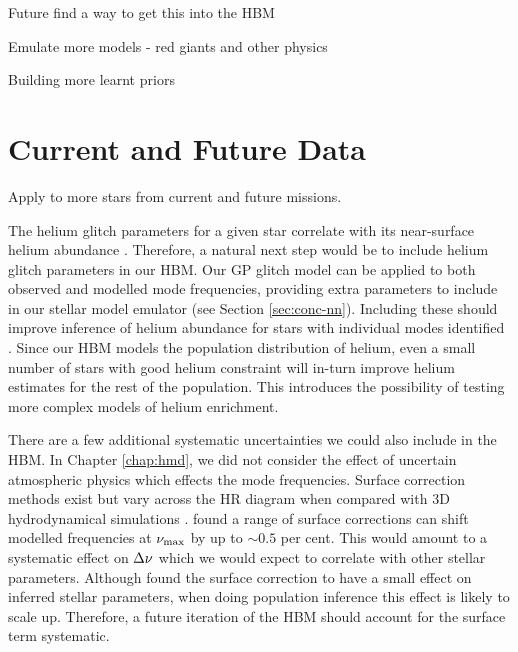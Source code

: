 Future find a way to get this into the HBM

Emulate more models - red giants and other physics

Building more learnt priors

\section{Current and Future Data}

Apply to more stars from current and future missions.


The helium glitch parameters for a given star correlate with its near-surface helium abundance \citep{Houdek.Gough2007}. Therefore, a natural next step would be to include helium glitch parameters in our HBM. Our GP glitch model can be applied to both observed and modelled mode frequencies, providing extra parameters to include in our stellar model emulator (see Section \ref{sec:conc-nn}). Including these should improve inference of helium abundance for stars with individual modes identified \citep[e.g.][]{Davies.SilvaAguirre.ea2016,Lund.SilvaAguirre.ea2017}. Since our HBM models the population distribution of helium, even a small number of stars with good helium constraint will in-turn improve helium estimates for the rest of the population. This introduces the possibility of testing more complex models of helium enrichment.


There are a few additional systematic uncertainties we could also include in the HBM. In Chapter \ref{chap:hmd}, we did not consider the effect of uncertain atmospheric physics which effects the mode frequencies. Surface correction methods exist \citep[e.g.][]{Ball.Gizon2014,Kjeldsen.Bedding.ea2008} but vary across the HR diagram when compared with 3D hydrodynamical simulations \cite{Sonoi.Samadi.ea2015}. \citet{Compton.Bedding.ea2018} found a range of surface corrections can shift modelled frequencies at \({\nu_\mathrm{max}}\) by up to \(\sim 0.5\) per cent. This would amount to a systematic effect on \({\Delta\nu}\) which we would expect to correlate with other stellar parameters. Although \citet{Nsamba.Campante.ea2018} found the surface correction to have a small effect on inferred stellar parameters, when doing population inference this effect is likely to scale up. Therefore, a future iteration of the HBM should account for the surface term systematic.

